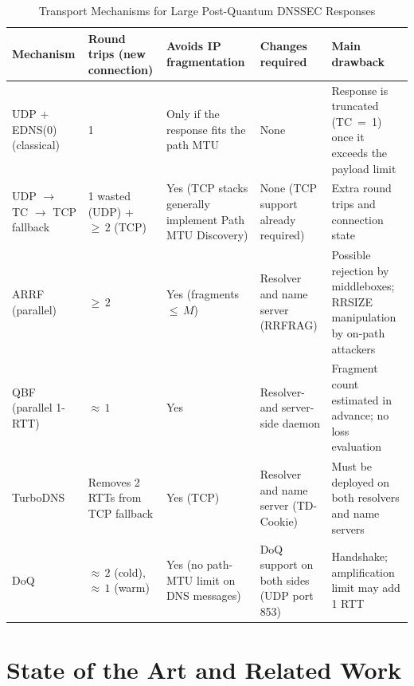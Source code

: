 \documentclass[conference]{IEEEtran}
\begin{document}
\begin{table}[!t]
\caption{Transport Mechanisms for Large Post-Quantum DNSSEC Responses}
\label{tab:transports}
\centering
\footnotesize
\begin{tabularx}{\textwidth}{|X|p{}|X|X|X|}
\hline
\textbf{Mechanism} & \textbf{Round trips (new connection)} & \textbf{Avoids IP fragmentation} & \textbf{Changes required} & \textbf{Main drawback} \\
\hline
UDP + EDNS(0) (classical)~\cite{rfc1035,rfc6891,rfc9715} & 1 & Only if the response fits the path MTU & None & Response is truncated (TC~=~1) once it exceeds the payload limit \\
\hline
UDP $\rightarrow$ TC $\rightarrow$ TCP fallback~\cite{rfc7766,turbodns} & 1 wasted (UDP) + ${\geq}\,2$ (TCP) & Yes (TCP stacks generally implement Path MTU Discovery) & None (TCP support already required) & Extra round trips and connection state \\
\hline
ARRF (parallel)~\cite{arrf} & ${\geq}\,2$ & Yes (fragments ${\leq}\,M$) & Resolver and name server (RRFRAG) & Possible rejection by middleboxes; RRSIZE manipulation by on-path attackers \\
\hline
QBF (parallel 1-RTT)~\cite{qbf} & ${\approx}\,1$ & Yes & Resolver- and server-side daemon & Fragment count estimated in advance; no loss evaluation \\
\hline
TurboDNS~\cite{turbodns} & Removes 2 RTTs from TCP fallback & Yes (TCP) & Resolver and name server (TD-Cookie) & Must be deployed on both resolvers and name servers \\
\hline
DoQ~\cite{rfc9250,rfc9000,doqfirstlook} & ${\approx}\,2$ (cold), ${\approx}\,1$ (warm) & Yes (no path-MTU limit on DNS messages) & DoQ support on both sides (UDP port 853) & Handshake; amplification limit may add 1 RTT \\
\hline
\end{tabularx}
\end{table}

\section{State of the Art and Related Work}
\label{sec:related}
\end{document}
